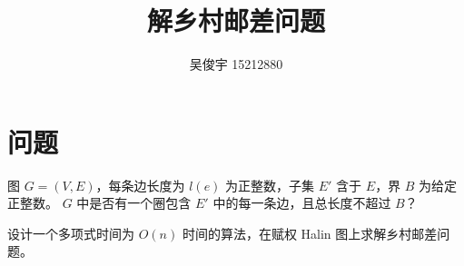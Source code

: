 \documentclass{ctexart}
\title{解乡村邮差问题}
\author{吴俊宇 15212880}
\begin{document}
\maketitle

\section{问题}

图 $G = (V, E)$，每条边长度为 $l(e)$ 为正整数，子集 $E'$ 含于 $E$，界 $B$ 为给定正整数。
$G$ 中是否有一个圈包含 $E'$ 中的每一条边，且总长度不超过 $B$？

设计一个多项式时间为 $O(n)$ 时间的算法，在赋权 Halin 图上求解乡村邮差问题。
\end{document}
